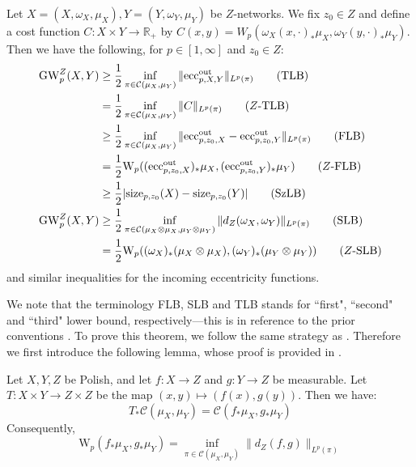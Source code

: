 \documentclass[twoside,11pt]{article}
\theoremstyle{definition}
\newcommand{\dgwz}{\mathrm{GW}_p^Z}
\newcommand{\eccout}{\textnormal{ecc}_{p,X,Y}^{\textnormal{out}}}
\newcommand{\eccoutpX}{\textnormal{ecc}_{p,z_0,X}^{\textnormal{out}}}
\newcommand{\eccoutpY}{\textnormal{ecc}_{p,z_0,Y}^{\textnormal{out}}}
\begin{document}
\begin{theorem}
    \label{thm:lower_bounds}
    Let $X=(X,\omega_X,\mu_X), Y=(Y,\omega_Y,\mu_Y)$ be $Z$-networks. We fix $z_0\in Z$ and define a cost function $C:X\times Y\to \mathbb{R}_{+}$ by $C(x,y) = W_p(\omega_X(x,\cdot)_*\mu_X, \omega_Y(y,\cdot)_* \mu_Y)$. Then we have the following, for $p\in [1,\infty]$ and $z_0\in Z$:
    \begin{align}
        \dgwz(X,Y) & \geq \frac{1}{2}\inf_{\pi \in \mathcal{C}(\mu_X,\mu_Y)} \|\eccout\|_{L^p(\pi)} \tag{TLB} \label{ineq:TLB}                                         \\ &=\frac{1}{2}\inf_{\pi \in \mathcal{C}(\mu_X,\mu_Y)}\|C\|_{L^p(\pi)} \tag{$Z$-TLB} \label{ineq: Z-TLB} \\ &\geq \frac{1}{2}\inf_{\pi \in \mathcal{C}(\mu_X,\mu_Y)}\|\eccoutpX -\eccoutpY\|_{L^p(\pi)} \tag{FLB} \label{ineq:FLB} \\
                   & = \frac{1}{2}\mathrm{W}_p((\eccoutpX)_*\mu_X, (\eccoutpY)_*\mu_Y) \tag{$Z$-FLB} \label{ineq: Z-FLB}                                                        \\
                   & \geq \frac{1}{2}|\textnormal{size}_{p,z_0}(X)-\textnormal{size}_{p,z_0}(Y)| \tag{SzLB}    \label{ineq:SzLB}                                       \\
        \dgwz(X,Y) & \geq \frac{1}{2}\inf_{\pi \in \mathcal{C}(\mu_X\otimes \mu_X,\mu_Y\otimes \mu_Y)}\|d_Z(\omega_X,\omega_Y)\|_{L^p(\pi)} \tag{SLB} \label{ineq:SLB} \\ &= \frac{1}{2}\mathrm{W}_p((\omega_X)_*(\mu_X\otimes \mu_X), (\omega_Y)_*(\mu_Y\otimes \mu_Y)) \tag{$Z$-SLB} \label{ineq: Z-SLB}
    \end{align}
    and similar inequalities for the incoming eccentricity functions.
\end{theorem}
We note that the terminology FLB, SLB and TLB stands for ``first", ``second" and ``third" lower bound, respectively---this is in reference to the prior conventions \citep{memoli2011,chowdhury2019gromov}.
To prove this theorem, we follow the same strategy as \citet[Theorem 24]{chowdhury2019gromov}. Therefore we first introduce the following lemma, whose proof is provided in .

\begin{lemma}
\label{lem:lemma28}
    Let $X,Y,Z$ be Polish, and let $f:X\to Z$ and $g:Y\to Z$ be measurable. Let $T:X\times Y\to Z\times Z$ be the map $(x,y)\mapsto (f(x),g(y))$. Then we have:
    \begin{equation}
        T_* \mathcal{C}(\mu_X,\mu_Y) = \mathcal{C}(f_*\mu_X,g_*\mu_Y)
    \end{equation}
    Consequently,
    \begin{equation}
        \mathrm{W}_p(f_*\mu_X,g_*\mu_Y) = \inf_{\pi\in \mathcal{C}(\mu_X,\mu_Y)}\|d_Z(f,g)\|_{L^p(\pi)}
    \end{equation}
\end{lemma}
\end{document}
